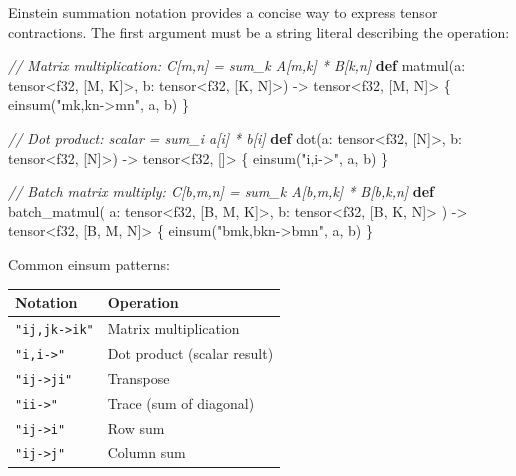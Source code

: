 \documentclass[
  english,
]{book}
\newenvironment{Shaded}{\begin{snugshade}}{\end{snugshade}}
\newcommand{\CommentTok}[1]{\textcolor[rgb]{0.42,0.60,0.33}{\textit{#1}}}
\newcommand{\DataTypeTok}[1]{\textcolor[rgb]{0.31,0.79,0.69}{#1}}
\newcommand{\FunctionTok}[1]{\textcolor[rgb]{0.86,0.86,0.67}{#1}}
\newcommand{\KeywordTok}[1]{\textcolor[rgb]{0.34,0.61,0.84}{\textbf{#1}}}
\newcommand{\NormalTok}[1]{\textcolor[rgb]{0.83,0.83,0.83}{#1}}
\newcommand{\OperatorTok}[1]{\textcolor[rgb]{0.83,0.83,0.83}{#1}}
\newcommand{\StringTok}[1]{\textcolor[rgb]{0.81,0.57,0.47}{#1}}
\begin{document}
Einstein summation notation provides a concise way to express tensor
contractions. The first argument must be a string literal describing the
operation:

\begin{Shaded}
\begin{Highlighting}[]
\CommentTok{// Matrix multiplication: C[m,n] = sum\_k A[m,k] * B[k,n]}
\KeywordTok{def}\NormalTok{ matmul(a: }\DataTypeTok{tensor}\OperatorTok{\textless{}}\DataTypeTok{f32}\NormalTok{, [M, K]}\OperatorTok{\textgreater{}}\NormalTok{, b: }\DataTypeTok{tensor}\OperatorTok{\textless{}}\DataTypeTok{f32}\NormalTok{, [K, N]}\OperatorTok{\textgreater{}}\NormalTok{) }\OperatorTok{{-}\textgreater{}} \DataTypeTok{tensor}\OperatorTok{\textless{}}\DataTypeTok{f32}\NormalTok{, [M, N]}\OperatorTok{\textgreater{}}\NormalTok{ \{}
    \FunctionTok{einsum}\NormalTok{(}\StringTok{"mk,kn{-}\textgreater{}mn"}\NormalTok{, a, b)}
\NormalTok{\}}

\CommentTok{// Dot product: scalar = sum\_i a[i] * b[i]}
\KeywordTok{def}\NormalTok{ dot(a: }\DataTypeTok{tensor}\OperatorTok{\textless{}}\DataTypeTok{f32}\NormalTok{, [N]}\OperatorTok{\textgreater{}}\NormalTok{, b: }\DataTypeTok{tensor}\OperatorTok{\textless{}}\DataTypeTok{f32}\NormalTok{, [N]}\OperatorTok{\textgreater{}}\NormalTok{) }\OperatorTok{{-}\textgreater{}} \DataTypeTok{tensor}\OperatorTok{\textless{}}\DataTypeTok{f32}\NormalTok{, []}\OperatorTok{\textgreater{}}\NormalTok{ \{}
    \FunctionTok{einsum}\NormalTok{(}\StringTok{"i,i{-}\textgreater{}"}\NormalTok{, a, b)}
\NormalTok{\}}

\CommentTok{// Batch matrix multiply: C[b,m,n] = sum\_k A[b,m,k] * B[b,k,n]}
\KeywordTok{def}\NormalTok{ batch\_matmul(}
\NormalTok{    a: }\DataTypeTok{tensor}\OperatorTok{\textless{}}\DataTypeTok{f32}\NormalTok{, [B, M, K]}\OperatorTok{\textgreater{}}\NormalTok{,}
\NormalTok{    b: }\DataTypeTok{tensor}\OperatorTok{\textless{}}\DataTypeTok{f32}\NormalTok{, [B, K, N]}\OperatorTok{\textgreater{}}
\NormalTok{) }\OperatorTok{{-}\textgreater{}} \DataTypeTok{tensor}\OperatorTok{\textless{}}\DataTypeTok{f32}\NormalTok{, [B, M, N]}\OperatorTok{\textgreater{}}\NormalTok{ \{}
    \FunctionTok{einsum}\NormalTok{(}\StringTok{"bmk,bkn{-}\textgreater{}bmn"}\NormalTok{, a, b)}
\NormalTok{\}}
\end{Highlighting}
\end{Shaded}

Common einsum patterns:

\begin{longtable}[]{@{}ll@{}}
\toprule\noalign{}
Notation & Operation \\
\midrule\noalign{}
\endhead
\bottomrule\noalign{}
\endlastfoot
\texttt{"ij,jk-\textgreater{}ik"} & Matrix multiplication \\
\texttt{"i,i-\textgreater{}"} & Dot product (scalar result) \\
\texttt{"ij-\textgreater{}ji"} & Transpose \\
\texttt{"ii-\textgreater{}"} & Trace (sum of diagonal) \\
\texttt{"ij-\textgreater{}i"} & Row sum \\
\texttt{"ij-\textgreater{}j"} & Column sum \\
\end{longtable}
\end{document}
